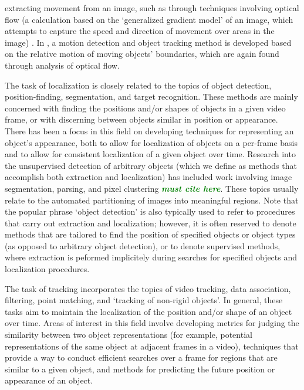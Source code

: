 \documentclass[smallcondensed, final]{svjour3}
\newcommand{\willie}[1]{\textcolor{green}{\textsf{\emph{\textbf{\textcolor{green}{#1}}}}}}
\begin{document}
extracting movement from an image, such as through techniques involving optical flow (a calculation based on the `generalized gradient model' of an image, which attempts to capture the speed and direction of movement over areas in the image) \citep{horn_1981, bobick_2001}. In \citep{black_2000}, a motion detection and object tracking method is developed based on the relative motion of moving objects' boundaries, which are again found through analysis of optical flow.

The task of localization is closely related to the topics of object detection, position-finding, segmentation, and target recognition. These methods are mainly concerned with finding the positions and/or shapes of objects in a given video frame, or with discerning between objects similar in position or appearance. There has been a focus in this field on developing techniques for representing an object's appearance, both to allow for localization of objects on a per-frame basis and to allow for consistent localization of a given object over time. Research into the unsupervised detection of arbitrary objects (which we define as methods that accomplish both extraction and localization) has included work involving image segmentation, parsing, and pixel clustering \willie{must cite here}. These topics usually relate to the automated partitioning of images into meaningful regions. Note that the popular phrase `object detection' is also typically used to refer to procedures that carry out extraction and localization; however, it is often reserved to denote methods that are tailored to find the position of specified objects or object types (as opposed to arbitrary object detection), or to denote supervised methods, where extraction is peformed implicitely during searches for specified objects and localization procedures.

The task of tracking incorporates the topics of video tracking, data association, filtering, point matching, and `tracking of non-rigid objects'. In general, these tasks aim to maintain the localization of the position and/or shape of an object over time. Areas of interest in this field involve developing metrics for judging the similarity between two object representations (for example, potential representations of the same object at adjacent frames in a video), techniques that provide a way to conduct efficient searches over a frame for regions that are similar to a given object, and methods for predicting the future position or appearance of an object. 
\end{document}
